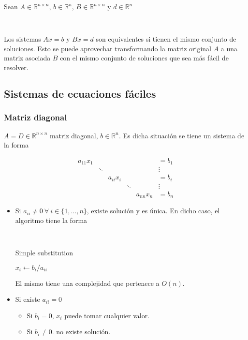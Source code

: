 Sean $A \in \mathbb{R}^{n \times n}$, $b \in \mathbb{R}^{n}$, $B \in \mathbb{R}^{n \times n}$ y $d \in \mathbb{R}^{n}$

\

Los sistemas $Ax = b$ y $Bx = d$ son equivalentes si tienen el mismo conjunto de soluciones. Esto se puede aprovechar transformando la matriz original $A$ a una matriz asociada $B$ con el mismo conjunto de soluciones que sea más fácil de resolver.

\subsection{Sistemas de ecuaciones fáciles}\label{subsec:sistemas_de_ecuaciones_faciles}

\subsubsection{Matriz diagonal}\label{subsubsec:matriz_diagonal}

$A = D \in \mathbb{R}^{n \times n}$ matriz diagonal, $b \in \mathbb{R}^{n}$. Es dicha situación se tiene un sistema de la forma

\[
\begin{matrix}
a_{11}x_{1} &  &  &  &  & = b_1 \\
 & \ddots &  & &  & \vdots \\
 & & a_{ii}x_{i} & & & = b_{i} \\
 & &  & \ddots & & \vdots \\
 & & & & a_{nn}x_n & = b_n
\end{matrix}
\]

\begin{itemize}
    \item Si $a_{ii} \neq 0 ~\forall~ i \in \{1,\ldots,n\}$, existe solución y es única. En dicho caso, el algoritmo tiene la forma
    
    \
    
    \begin{algorithm}
    \caption{Simple substitution}
    \label{alg:simple_substitution}
    \begin{algorithmic}
        \State $x_i \gets b_i/a_{ii}$    
    \EndFor
    \end{algorithmic}
    \end{algorithm}
    
    El mismo tiene una complejidad que pertenece a $O(n)$.
    
    \item Si existe $a_{ii} = 0$
    \begin{itemize}
        \item Si $b_{i} = 0$, $x_i$ puede tomar cualquier valor.
        \item Si $b_{i} \neq 0$. no existe solución.
    \end{itemize}
    
\end{itemize}


